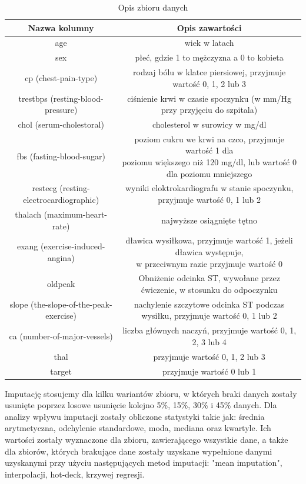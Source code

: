 \documentclass{classrep}
\begin{document}
{        \begin{table}
            \centering
            \begin{tabular}{|c|c|}
                \hline
                Nazwa kolumny & Opis zawartości \\ \hline
                age & wiek w latach   \\ \hline
                sex & płeć, gdzie 1 to mężczyzna a 0 to kobieta  \\ \hline
                cp (chest-pain-type) & rodzaj bólu w klatce piersiowej, przyjmuje wartość 0, 1, 2 lub 3  \\ \hline
                trestbps (resting-blood-pressure) & ciśnienie krwi w czasie spoczynku (w mm/Hg przy przyjęciu do szpitala) \\ \hline
                chol (serum-cholestoral) & cholesterol w surowicy w mg/dl  \\ \hline
                fbs (fasting-blood-sugar) & \makecell{poziom cukru we krwi na czco, przyjmuje wartość 1 dla \\ poziomu większego niż 120 mg/dl, lub wartość 0 dla poziomu mniejszego}  \\ \hline
                restecg (resting-electrocardiographic) & wyniki eloktrokardiografu w stanie spoczynku, przyjmuje wartość 0, 1 lub 2   \\ \hline
                thalach (maximum-heart-rate) & najwyższe osiągnięte tętno   \\ \hline
                exang (exercise-induced-angina) & \makecell{dławica wysiłkowa, przyjmuje wartość 1, jeżeli dławica występuje, \\ w przeciwnym razie przyjmuje wartość 0}   \\ \hline
                oldpeak & Obniżenie odcinka ST, wywołane przez ćwiczenie, w stosunku do odpoczynku   \\ \hline
                slope (the-slope-of-the-peak-exercise) & nachylenie szczytowe odcinka ST podczas wysiłku, przyjmuje wartość 0, 1 lub 2  \\ \hline
                ca (number-of-major-vessels) & liczba głównych naczyń, przyjmuje wartość 0, 1, 2, 3 lub 4  \\ \hline
                thal & przyjmuje wartość 0, 1, 2 lub 3   \\ \hline
                target & przyjmuje wartość 0 lub 1 \\ \hline
            \end{tabular}
            \caption{Opis zbioru danych}
            \label{opis-zbioru-danych}
        \end{table}
        \FloatBarrier
        Imputację stosujemy dla kilku wariantów zbioru, w których braki danych zostały usunięte poprzez losowe usunięcie kolejno 5\%, 15\%, 30\% i 45\% danych. Dla analizy wpływu imputacji zostały obliczone statystyki takie jak: średnia arytmetyczna, odchylenie standardowe, moda, mediana oraz kwartyle. Ich wartości zostały wyznaczone dla zbioru, zawierającego wszystkie dane, a także dla zbiorów, których brakujące dane zostały uzyskane wypełnione danymi uzyskanymi przy użyciu następujących metod imputacji: "mean imputation", interpolacji, hot-deck, krzywej regresji.
        
}
\end{document}
